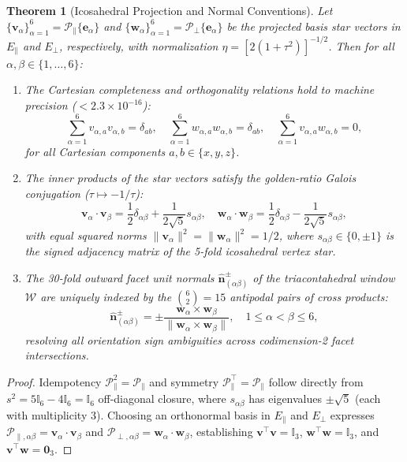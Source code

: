 \documentclass[aps,prx,twocolumn,superscriptaddress,longbibliography,nofootinbib]{revtex4-2}
\newtheorem{theorem}{Theorem}[section]
\begin{document}
\begin{theorem}[Icosahedral Projection and Normal Conventions]
Let $\{\bm{v}_\alpha\}_{\alpha=1}^6 = \mathcal{P}_\parallel \{\bm{e}_\alpha\}$ and $\{\bm{w}_\alpha\}_{\alpha=1}^6 = \mathcal{P}_\perp \{\bm{e}_\alpha\}$ be the projected basis star vectors in $E_\parallel$ and $E_\perp$, respectively, with normalization $\eta = [2(1 + \tau^2)]^{-1/2}$. Then for all $\alpha, \beta \in \{1, \dots, 6\}$:
\begin{enumerate}
\item The Cartesian completeness and orthogonality relations hold to machine precision ($< 2.3 \times 10^{-16}$):
\begin{equation}
\sum_{\alpha=1}^6 v_{\alpha, a} v_{\alpha, b} = \delta_{ab}, \quad \sum_{\alpha=1}^6 w_{\alpha, a} w_{\alpha, b} = \delta_{ab}, \quad \sum_{\alpha=1}^6 v_{\alpha, a} w_{\alpha, b} = 0,
\end{equation}
for all Cartesian components $a, b \in \{x, y, z\}$.
\item The inner products of the star vectors satisfy the golden-ratio Galois conjugation ($\tau \mapsto -1/\tau$):
\begin{equation}
\bm{v}_\alpha \cdot \bm{v}_\beta = \frac{1}{2}\delta_{\alpha\beta} + \frac{1}{2\sqrt{5}} s_{\alpha\beta}, \quad \bm{w}_\alpha \cdot \bm{w}_\beta = \frac{1}{2}\delta_{\alpha\beta} - \frac{1}{2\sqrt{5}} s_{\alpha\beta},
\end{equation}
with equal squared norms $\|\bm{v}_\alpha\|^2 = \|\bm{w}_\alpha\|^2 = 1/2$, where $s_{\alpha\beta} \in \{0, \pm 1\}$ is the signed adjacency matrix of the 5-fold icosahedral vertex star.
\item The 30-fold outward facet unit normals $\hat{\bm{n}}_{(\alpha\beta)}^\pm$ of the triacontahedral window $\mathcal{W}$ are uniquely indexed by the $\binom{6}{2} = 15$ antipodal pairs of cross products:
\begin{equation}
\hat{\bm{n}}_{(\alpha\beta)}^\pm = \pm \frac{\bm{w}_\alpha \times \bm{w}_\beta}{\|\bm{w}_\alpha \times \bm{w}_\beta\|}, \quad 1 \le \alpha < \beta \le 6,
\end{equation}
resolving all orientation sign ambiguities across codimension-2 facet intersections.
\end{enumerate}
\end{theorem}

\begin{proof}
Idempotency $\mathcal{P}_\parallel^2 = \mathcal{P}_\parallel$ and symmetry $\mathcal{P}_\parallel^\top = \mathcal{P}_\parallel$ follow directly from $s^2 = 5\mathbb{I}_6 - 4\mathbb{I}_6 = \mathbb{I}_6$ off-diagonal closure, where $s_{\alpha\beta}$ has eigenvalues $\pm\sqrt{5}$ (each with multiplicity 3). Choosing an orthonormal basis in $E_\parallel$ and $E_\perp$ expresses $\mathcal{P}_{\parallel, \alpha\beta} = \bm{v}_\alpha \cdot \bm{v}_\beta$ and $\mathcal{P}_{\perp, \alpha\beta} = \bm{w}_\alpha \cdot \bm{w}_\beta$, establishing $\bm{v}^\top \bm{v} = \mathbb{I}_3$, $\bm{w}^\top \bm{w} = \mathbb{I}_3$, and $\bm{v}^\top \bm{w} = \mathbf{0}_3$.
\end{proof}
\end{document}

